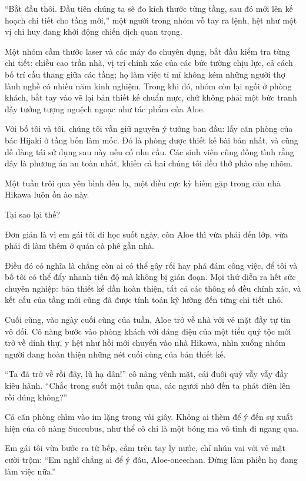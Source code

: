 \documentclass[../main.tex]{subfiles}
\begin{document}
``Bắt đầu thôi. Đầu tiên chúng ta sẽ đo kích thước từng tầng, sau đó mới lên kế hoạch chi tiết cho tầng mới,'' một người trong nhóm vỗ tay ra lệnh, hệt như một vị chỉ huy đang khởi động chiến dịch quan trọng.

Một nhóm cầm thước laser và các máy đo chuyên dụng, bắt đầu kiểm tra từng chi tiết: chiều cao trần nhà, vị trí chính xác của các bức tường chịu lực, cả cách bố trí cầu thang giữa các tầng; họ làm việc tỉ mỉ không kém những người thợ lành nghề có nhiều năm kinh nghiệm. Trong khi đó, nhóm còn lại ngồi ở phòng khách, bắt tay vào vẽ lại bản thiết kế chuẩn mực, chứ không phải một bức tranh đầy tưởng tượng nguệch ngoạc như tác phẩm của Aloe.

Với bố tôi và tôi, chúng tôi vẫn giữ nguyên ý tưởng ban đầu: lấy căn phòng của bác Hijaki ở tầng bốn làm mốc. Đó là phòng được thiết kế bài bản nhất, và cũng dễ dàng tái sử dụng sau này nếu có nhu cầu. Các sinh viên cũng đồng tình rằng đây là phương án an toàn nhất, khiến cả hai chúng tôi đều thở phào nhẹ nhõm.

Một tuần trôi qua yên bình đến lạ, một điều cực kỳ hiếm gặp trong căn nhà Hikawa luôn ồn ào này.

Tại sao lại thế?

Đơn giản là vì em gái tôi đi học suốt ngày, còn Aloe thì vừa phải đến lớp, vừa phải đi làm thêm ở quán cà phê gần nhà.

Điều đó có nghĩa là chẳng còn ai có thể gây rối hay phá đám công việc, để tôi và bố tôi có thể đẩy nhanh tiến độ mà không bị gián đoạn. Mọi thứ diễn ra hết sức chuyên nghiệp: bản thiết kế dần hoàn thiện, tất cả các thông số đều chính xác, và kết cấu của tầng mới cũng đã được tính toán kỹ lưỡng đến từng chi tiết nhỏ.

Cuối cùng, vào ngày cuối cùng của tuần, Aloe trở về nhà với vẻ mặt đầy tự tin vô đối. Cô nàng bước vào phòng khách với dáng điệu của một tiểu quý tộc mới trở về dinh thự, y hệt như hồi mới chuyển vào nhà Hikawa, nhìn xuống nhóm người đang hoàn thiện những nét cuối cùng của bản thiết kế.

``Ta đã trở về rồi đây, lũ hạ dân!'' cô nàng vênh mặt, cái đuôi quỷ vẫy vẫy đầy kiêu hãnh. ``Chắc trong suốt một tuần qua, các ngươi nhớ đến ta phát điên lên rồi đúng không?''

Cả căn phòng chìm vào im lặng trong vài giây. Không ai thèm để ý đến sự xuất hiện của cô nàng Succubus, như thể cô chỉ là một bóng ma vô tình đi ngang qua.

Em gái tôi vừa bước ra từ bếp, cầm trên tay ly nước, chỉ nhún vai với vẻ mặt cười trộm: ``Em nghĩ chẳng ai để ý đâu, Aloe-oneechan. Đừng làm phiền họ đang làm việc nữa.''
\end{document}
